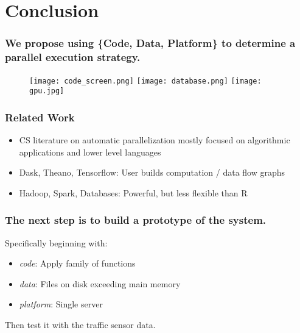\documentclass{beamer}
\begin{document}
\begin{frame}[fragile]
\end{frame}
\section{Conclusion}
\begin{frame}

    \frametitle{We propose using \{Code, Data, Platform\} to determine a
    parallel execution strategy.}


\begin{figure}
            \texttt{[image: code\_screen.png]}
            \hfill
            \texttt{[image: database.png]}
            \hfill
            \texttt{[image: gpu.jpg]}
\end{figure}

\end{frame}
\begin{frame}

    \frametitle{Related Work}


\begin{itemize}
    \item CS literature on automatic parallelization mostly focused on algorithmic applications
        and lower level languages
    \item Dask, Theano, Tensorflow: User builds computation / data flow graphs
    \item Hadoop, Spark, Databases: Powerful, but less flexible than R
\end{itemize}

\end{frame}
\begin{frame}

    \frametitle{The next step is to build a prototype of the system.}


    Specifically beginning with:

\begin{itemize}
    \item \emph{code}: Apply family of functions
    \item \emph{data}: Files on disk exceeding main memory
    \item \emph{platform}: Single server
\end{itemize}

Then test it with the traffic sensor data.

\end{frame}
\end{document}
